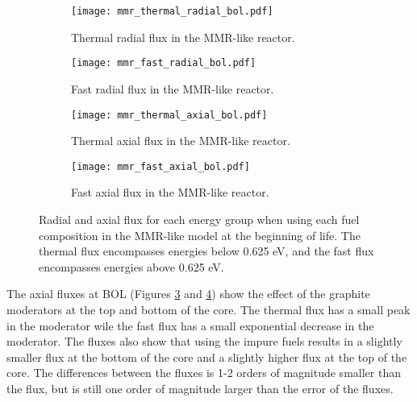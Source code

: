 \begin{figure}[h!]
        \centering
        \begin{subfigure}[b]{0.48\textwidth}
            \centering
            \texttt{[image: mmr\_thermal\_radial\_bol.pdf]}
            \caption{Thermal radial flux in the \gls{MMR}-like reactor.}
            \label{fig:mmr_thermal_radial_bol}
        \end{subfigure}
        \hfill
        \begin{subfigure}[b]{0.48\textwidth}
            \centering
            \texttt{[image: mmr\_fast\_radial\_bol.pdf]}
            \caption{Fast radial flux in the \gls{MMR}-like reactor.}
            \label{fig:mmr_fast_radial_bol}
        \end{subfigure}
        \hfill            
        \begin{subfigure}[b]{0.48\textwidth}
            \centering
            \texttt{[image: mmr\_thermal\_axial\_bol.pdf]}
            \caption{Thermal axial flux in the \gls{MMR}-like reactor. }
            \label{fig:mmr_thermal_axial_bol}
        \end{subfigure}
        \hfill
        \begin{subfigure}[b]{0.48\textwidth}
            \centering
            \texttt{[image: mmr\_fast\_axial\_bol.pdf]}
            \caption{Fast axial flux in the \gls{MMR}-like reactor.}
            \label{fig:mmr_fast_axial_bol}
        \end{subfigure}
        \hfill
        \caption{Radial and axial flux for each energy group when using 
        each fuel composition in the \gls{MMR}-like model at the beginning 
        of life. The thermal flux encompasses energies below 0.625 eV, and the 
        fast flux encompasses energies above 0.625 eV.}
        \label{fig:mmr_bol}
   \end{figure}

The axial fluxes at \gls{BOL} (Figures \ref{fig:mmr_thermal_axial_bol} and 
\ref{fig:mmr_fast_axial_bol}) show the effect of the graphite moderators at 
the top and bottom of the core. The thermal flux has a small peak in the 
moderator wile the fast flux has a small exponential decrease in the 
moderator. The fluxes also show that using the impure fuels results in 
a slightly smaller flux at the bottom of the core and a slightly higher 
flux at the top of the core. The differences between the 
fluxes is 1-2 orders of magnitude smaller than the flux, but is 
still one order of magnitude larger than the error of the fluxes.

